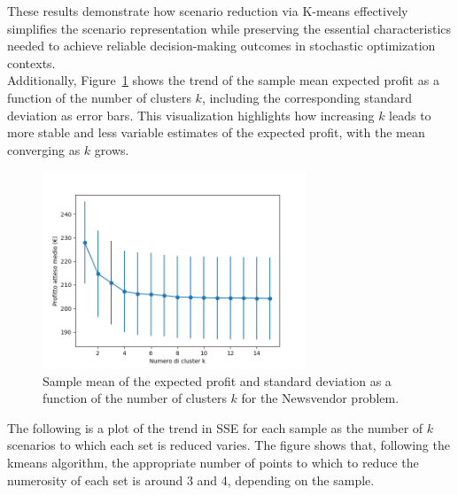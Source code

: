 \documentclass[a4paper,12pt]{article}
\begin{document}
	
	\noindent These results demonstrate how scenario reduction via K-means effectively simplifies the scenario representation while preserving the essential characteristics needed to achieve reliable decision-making outcomes in stochastic optimization contexts.\\
	
	\noindent
	Additionally, Figure~\ref{fig:rendimentoK-nv} shows the trend of the sample mean expected profit as a function of the number of clusters $k$, including the corresponding standard deviation as error bars. This visualization highlights how increasing $k$ leads to more stable and less variable estimates of the expected profit, with the mean converging as $k$ grows.
	
	\begin{figure}[H]
		\centering
		\includegraphics[width=0.7\textwidth]{../immagini/rendimentoK_nv.png}
		\caption{Sample mean of the expected profit and standard deviation as a function of the number of clusters $k$ for the Newsvendor problem.}
		\label{fig:rendimentoK-nv}
	\end{figure}
	
	
	\noindent The following is a plot of the trend in SSE for each sample as the number of $k$ scenarios to which each set is reduced varies. The figure shows that, following the kmeans algorithm, the appropriate number of points to which to reduce the numerosity of each set is around 3 and 4, depending on the sample.
	
\end{document}
